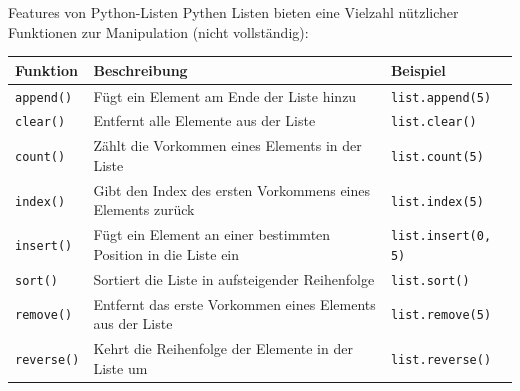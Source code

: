 \documentclass[xelatex,aspectratio=169]{beamer}
\begin{document}
\begin{frame}{Features von Python-Listen}
  Pythen Listen bieten eine Vielzahl nützlicher Funktionen zur Manipulation (nicht vollständig):
  \begin{tabularx}{\textwidth}{lXl}
    \toprule
    \textbf{Funktion}  & \textbf{Beschreibung}                                          & \textbf{Beispiel}          \\
    \midrule
    \texttt{append()}  & Fügt ein Element am Ende der Liste hinzu                       & \texttt{list.append(5)}    \\
    \texttt{clear()}   & Entfernt alle Elemente aus der Liste                           & \texttt{list.clear()}      \\
    \texttt{count()}   & Zählt die Vorkommen eines Elements in der Liste                & \texttt{list.count(5)}     \\
    \texttt{index()}   & Gibt den Index des ersten Vorkommens eines Elements zurück     & \texttt{list.index(5)}     \\
    \texttt{insert()}  & Fügt ein Element an einer bestimmten Position in die Liste ein & \texttt{list.insert(0, 5)} \\
    \texttt{sort()}    & Sortiert die Liste in aufsteigender Reihenfolge                & \texttt{list.sort()}       \\
    \texttt{remove()}  & Entfernt das erste Vorkommen eines Elements aus der Liste      & \texttt{list.remove(5)}    \\
    \texttt{reverse()} & Kehrt die Reihenfolge der Elemente in der Liste um             & \texttt{list.reverse()}    \\
    \bottomrule
  \end{tabularx}
\end{frame}
\end{document}

